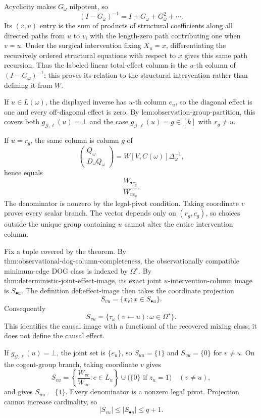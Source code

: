 Acyclicity makes \(G_\omega\) nilpotent, so
\[
(I-G_\omega)^{-1}=I+G_\omega+G_\omega^2+\cdots.
\]
Its \((v,u)\) entry is the sum of products of structural coefficients along all directed paths from \(u\) to \(v\), with the length-zero path contributing one when \(v=u\). Under the surgical intervention fixing \(X_u=x\), differentiating the recursively ordered structural equations with respect to \(x\) gives this same path recursion. Thus the labeled linear total-effect column is the \(u\)-th column of \((I-G_\omega)^{-1}\); this proves its relation to the structural intervention rather than defining it from \(W\).

If \(u\in L(\omega)\), the displayed inverse has \(u\)-th column \(e_u\), so the diagonal effect is one and every off-diagonal effect is zero. By \(\text{lem:observation-group-partition}\), this covers both \(g_{\mathcal G,\ell}(u)=\bot\) and the case \(g_{\mathcal G,\ell}(u)=g\in[k]\) with \(r_g\ne u\).

If \(u=r_g\), the same column is column \(g\) of
\[
\begin{pmatrix}Q_\omega\\D_\omega Q_\omega\end{pmatrix}
=W[V,C(\omega)]\Delta_\omega^{-1},
\]
hence equals
\[
\frac{W_{\bullet c_g}}{W_{uc_g}}.
\]
The denominator is nonzero by the legal-pivot condition. Taking coordinate \(v\) proves every scalar branch. The vector depends only on \((r_g,c_g)\), so choices outside the unique group containing \(u\) cannot alter the entire intervention column.

Fix a tuple covered by the theorem. By \(\text{thm:observational-dog-column-completeness}\), the observationally compatible minimum-edge DOG class is indexed by \(\Omega^\star\). By \(\text{thm:deterministic-joint-effect-image}\), its exact joint \(u\)-intervention-column image is \(S_{\bullet u}\). The definition \(\text{def:effect-image}\) then takes the coordinate projection
\[
S_{vu}=\{x_v:x\in S_{\bullet u}\}.
\]
Consequently
\[
S_{vu}=\{\tau_\omega(v\leftarrow u):\omega\in\Omega^\star\}.
\]
This identifies the causal image with a functional of the recovered mixing class; it does not define the causal effect.

If \(g_{\mathcal G,\ell}(u)=\bot\), the joint set is \(\{e_u\}\), so \(S_{uu}=\{1\}\) and \(S_{vu}=\{0\}\) for \(v\ne u\). On the cogent-group branch, taking coordinate \(v\) gives
\[
S_{vu}=\left\{\frac{W_{vc}}{W_{uc}}:c\in L_u\right\}
\cup\bigl(\{0\}\text{ if }z_u=1\bigr)\quad(v\ne u),
\]
and gives \(S_{uu}=\{1\}\). Every denominator is a nonzero legal pivot. Projection cannot increase cardinality, so
\[
|S_{vu}|\le |S_{\bullet u}|\le q+1.
\]

